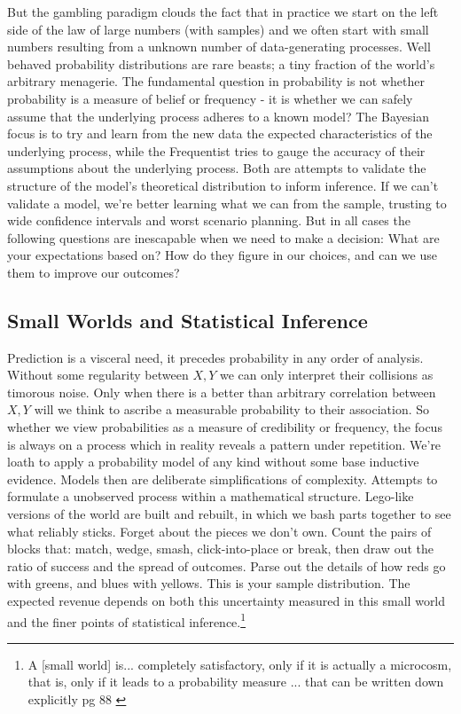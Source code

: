 \documentclass{tufte-handout}
\begin{document}
\noindent But the gambling paradigm clouds the fact that in practice we start on the left side of the law of large numbers (with samples) and we often start with small numbers resulting from a unknown number of data-generating processes. Well behaved probability distributions are rare beasts; a tiny fraction of the world's arbitrary menagerie. The fundamental question in probability is not whether probability is a measure of belief or frequency - it is whether we can safely assume that the underlying process adheres to a known model? The Bayesian focus is to try and learn from the new data the expected characteristics of the underlying process, while the Frequentist tries to gauge the accuracy of their assumptions about the underlying process. Both are attempts to validate the structure of the model's theoretical distribution to inform inference. If we can't validate a model, we're better learning what we can from the sample, trusting to wide confidence intervals and worst scenario planning. But in all cases the following questions are inescapable when we need to make a decision: What are your expectations based on? How do they figure in our choices, and can we use them to improve our outcomes? 

\subsection{Small Worlds and Statistical Inference}
\label{sec:Inference}
Prediction is a visceral need, it precedes probability in any order of analysis. Without some regularity between $X, Y$ we can only interpret their collisions as timorous noise. Only when there is a better than arbitrary correlation between $X, Y$ will we think to ascribe a measurable probability to their association. So whether we view probabilities as a measure of credibility or frequency, the focus is always on a process which in reality reveals a pattern under repetition. We're loath to apply a probability model of any kind without some base inductive evidence. Models then are deliberate simplifications of complexity. Attempts to formulate a unobserved process within a mathematical structure. Lego-like versions of the world are built and rebuilt, in which we bash parts together to see what reliably sticks. Forget about the pieces we don't own. Count the pairs of blocks that: match, wedge, smash, click-into-place or break, then draw out the ratio of success and the spread of outcomes. Parse out the details of how reds go with greens, and blues with yellows. This is your sample distribution. The expected revenue depends on both this uncertainty measured in this small world and the finer points of statistical inference.\footnote{A [small world] is... completely satisfactory, only if it is actually a microcosm, that is, only if it leads to a probability measure ... that can be written down explicitly pg 88 \cite{savage54}}
\linebreak
\end{document}
